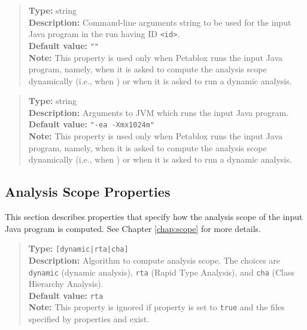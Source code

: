 \begin{quote}
{\bf Type:} string \\
{\bf Description:} Command-line arguments string to be used for the input Java program in the run having ID {\tt <id>}. \\
{\bf Default value:} {\tt ""} \\
{\bf Note:} This property is used only when Petablox runs the input Java program, namely, when it is asked to compute the analysis scope dynamically (i.e., when ) or when it is asked to run a dynamic analysis.
\end{quote}

\begin{quote}
{\bf Type:} string \\
{\bf Description:} Arguments to JVM which runs the input Java program. \\
{\bf Default value:} {\tt "-ea -Xmx1024m"} \\
{\bf Note:} This property is used only when Petablox runs the input Java program, namely, when it is asked to compute the analysis scope dynamically (i.e., when ) or when it is asked to run a dynamic analysis. 
\end{quote}

\subsection{Analysis Scope Properties}
\label{sec:scope-props}

This section describes properties that specify how the analysis scope of the input Java program is computed.
See Chapter \ref{chap:scope} for more details.

\begin{quote}
{\bf Type:} {\tt [dynamic|rta|cha]} \\
{\bf Description:} Algorithm to compute analysis scope.  The choices are {\tt dynamic} (dynamic analysis), {\tt rta} (Rapid Type Analysis), and {\tt cha} (Class Hierarchy Analysis). \\
{\bf Default value:} {\tt rta} \\
{\bf Note:} This property is ignored if property  is set to {\tt true} and the files specified by properties  and  exist. 
\end{quote}

